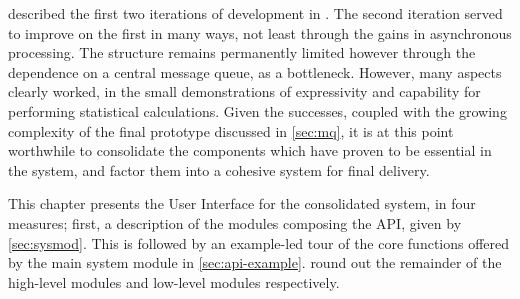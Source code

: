  described the first two iterations of development in \lsr{}.
The second iteration served to improve on the first in many ways, not least through the gains in asynchronous processing.
The structure remains permanently limited however through the dependence on a central message queue, as a bottleneck.
However, many aspects clearly worked, in the small demonstrations of expressivity and capability for performing statistical calculations.
Given the successes, coupled with the growing complexity of the final prototype discussed in \cref{sec:mq}, it is at this point worthwhile to consolidate the components which have proven to be essential in the system, and factor them into a cohesive system for final delivery.

This chapter presents the User Interface for the consolidated system, in four measures; first, a description of the modules composing the API, given by \cref{sec:sysmod}.
This is followed by an example-led tour of the core functions offered by the main system module in \cref{sec:api-example}.
 round out the remainder of the high-level modules and low-level modules respectively.
